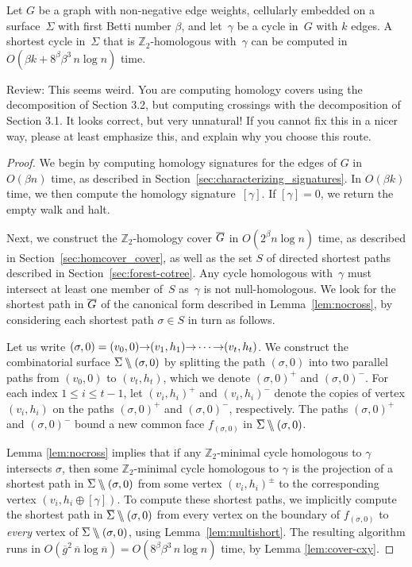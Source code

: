 \documentclass[letterpaper,review]{siamart190516}
\def\arcto{\mathord\shortrightarrow}
\def\Z{\mathbb{Z}}
\def\snip{\mathbin{\raisebox{0.15ex}{\rotatebox[origin=c]{60}{\Rightscissors}\!}}}
\def\snip{\mathbin{\backslash\!\!\backslash}}
\def\cycle{\gamma}
\def\Sigmabar{\overline{\smash{\Sigma}\vphantom{t}}}
\def\Gbar{\overline{\smash{G}\vphantom{t}}}
\def\nbar{\overline{n}}
\def\gbar{\overline{g}}
\def\rnote#1{\color{red}Review: #1 \color{black}}
\begin{document}
{\begin{theorem}
\label{thm:min-cycle}
Let $G$ be a  graph with non-negative edge weights, cellularly embedded on a surface~$\Sigma$ with first Betti number $\beta$, and let~$\cycle$ be a cycle in~$G$ with $k$ edges.  A shortest cycle in~$\Sigma$ that is $\Z_2$-homologous with~$\cycle$ can be computed in $O(\beta k + 8^\beta \beta^3\, n\log n)$ time.
\end{theorem}
\rnote{
This seems weird. You are computing homology covers using the decomposition of Section 3.2, but computing crossings with the decomposition of Section 3.1. It looks correct, but very unnatural! If you cannot fix this in a nicer way, please at least emphasize this, and explain why you choose this route. 
}
\begin{proof}
We begin by computing homology signatures for the edges of $G$ in $O(\beta n)$ time, as described in Section~\ref{sec:characterizing_signatures}.  In $O(\beta k)$ time, we then compute the homology signature~$[\cycle]$.  If $[\cycle] = 0$, we return the empty walk and halt.

Next, we construct the $\Z_2$-homology cover $\Gbar$ in $O(2^\beta n\log n)$ time, as described in Section~\ref{sec:homcover_cover}, as well as the set $S$ of directed shortest paths described in Section~\ref{sec:forest-cotree}.
Any cycle homologous with~$\cycle$ must intersect at least one member of~$S$ as~$\cycle$ is not null-homologous.
We look for the shortest path in $\Gbar$ of the canonical form described in Lemma~\ref{lem:nocross}, by considering each shortest path $\sigma\in S$ in turn as follows.

Let us write $(\sigma,0) = (v_0,0) \arcto (v_1,h_1) \arcto\allowbreak \cdots\arcto (v_t, h_t)$.  We construct the combinatorial surface $\Sigmabar\snip(\sigma,0)$ by splitting the path $(\sigma,0)$ into two parallel paths from $(v_0,0)$ to $(v_t,h_t)$, which we denote  $(\sigma,0)^+$ and $(\sigma,0)^-$.  For each index $1\le i\le t-1$, let $(v_i,h_i)^+$ and $(v_i,h_i)^-$ denote the copies of vertex $(v_i,h_i)$  on the paths $(\sigma,0)^+$ and $(\sigma,0)^-$, respectively.  The paths $(\sigma,0)^+$ and $(\sigma,0)^-$ bound a new common face $f_{(\sigma,0)}$ in $\Sigmabar\snip(\sigma,0)$.

Lemma \ref{lem:nocross} implies that if any $\Z_2$-minimal cycle homologous to $\cycle$ intersects $\sigma$, then some $\Z_2$-minimal cycle homologous to $\cycle$ is the projection of a shortest path in $\Sigmabar\snip(\sigma,0)$ from some vertex $(v_i,h_i)^\pm$ to the corresponding vertex $(v_i, h_i\oplus[\cycle])$.  To compute these shortest paths, we implicitly compute the shortest path in $\Sigmabar\snip(\sigma,0)$ from every vertex on the boundary of $f_{(\sigma,0)}$ to \emph{every} vertex of $\Sigmabar\snip(\sigma,0)$, using Lemma~\ref{lem:multishort}.
The resulting algorithm runs in $O(\gbar^2\,\nbar \log \nbar) = O(8^\beta \beta^3\, n\log n)$ time, by Lemma \ref{lem:cover-cxy}.
\end{proof}

}
\end{document}
